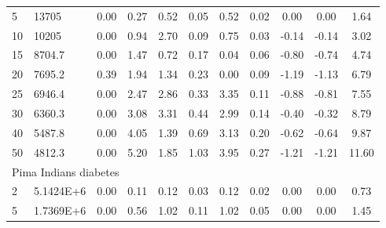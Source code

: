{\begin{longtable}{@{}llccccccccc@{}}
\multicolumn{1}{l|}{5}  & \multicolumn{1}{l|}{13705}      & 0.00 & \multicolumn{1}{c|}{0.27}  & 0.52  & \multicolumn{1}{c|}{0.05} & 0.52  & \multicolumn{1}{c|}{0.02} & 0.00      & 0.00      & 1.64  \\
\multicolumn{1}{l|}{10} & \multicolumn{1}{l|}{10205}      & 0.00 & \multicolumn{1}{c|}{0.94}  & 2.70  & \multicolumn{1}{c|}{0.09} & 0.75  & \multicolumn{1}{c|}{0.03} & -0.14     & -0.14     & 3.02  \\
\multicolumn{1}{l|}{15} & \multicolumn{1}{l|}{8704.7}     & 0.00 & \multicolumn{1}{c|}{1.47}  & 0.72  & \multicolumn{1}{c|}{0.17} & 0.04  & \multicolumn{1}{c|}{0.06} & -0.80     & -0.74     & 4.74  \\
\multicolumn{1}{l|}{20} & \multicolumn{1}{l|}{7695.2}     & 0.39 & \multicolumn{1}{c|}{1.94}  & 1.34  & \multicolumn{1}{c|}{0.23} & 0.00  & \multicolumn{1}{c|}{0.09} & -1.19     & -1.13     & 6.79  \\
\multicolumn{1}{l|}{25} & \multicolumn{1}{l|}{6946.4}     & 0.00 & \multicolumn{1}{c|}{2.47}  & 2.86  & \multicolumn{1}{c|}{0.33} & 3.35  & \multicolumn{1}{c|}{0.11} & -0.88     & -0.81     & 7.55  \\
\multicolumn{1}{l|}{30} & \multicolumn{1}{l|}{6360.3}     & 0.00 & \multicolumn{1}{c|}{3.08}  & 3.31  & \multicolumn{1}{c|}{0.44} & 2.99  & \multicolumn{1}{c|}{0.14} & -0.40     & -0.32     & 8.79  \\
\multicolumn{1}{l|}{40} & \multicolumn{1}{l|}{5487.8}     & 0.00 & \multicolumn{1}{c|}{4.05}  & 1.39  & \multicolumn{1}{c|}{0.69} & 3.13  & \multicolumn{1}{c|}{0.20} & -0.62     & -0.64     & 9.87  \\
\multicolumn{1}{l|}{50} & \multicolumn{1}{l|}{4812.3}     & 0.00 & \multicolumn{1}{c|}{5.20}  & 1.85  & \multicolumn{1}{c|}{1.03} & 3.95  & \multicolumn{1}{c|}{0.27} & -1.21     & -1.21     & 11.60 \\ \hline
\multicolumn{11}{l}{Pima Indians diabetes}                                                                                                                                                            \\ \hline
\multicolumn{1}{l|}{2}  & \multicolumn{1}{l|}{5.1424E+6}  & 0.00 & \multicolumn{1}{c|}{0.11}  & 0.12  & \multicolumn{1}{c|}{0.03} & 0.12  & \multicolumn{1}{c|}{0.02} & 0.00      & 0.00      & 0.73  \\
\multicolumn{1}{l|}{5}  & \multicolumn{1}{l|}{1.7369E+6}  & 0.00 & \multicolumn{1}{c|}{0.56}  & 1.02  & \multicolumn{1}{c|}{0.11} & 1.02  & \multicolumn{1}{c|}{0.05} & 0.00      & 0.00      & 1.45  \\

\end{longtable}}
